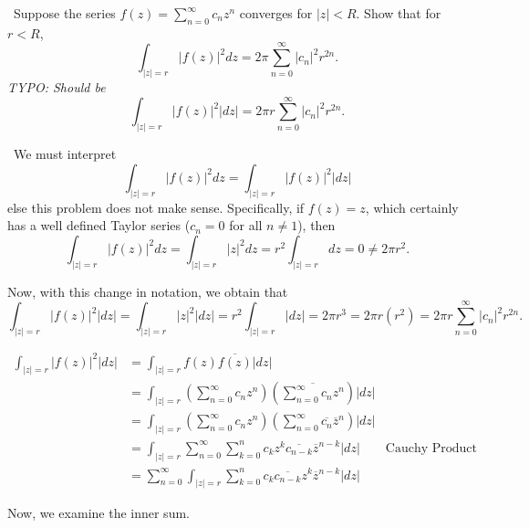 \documentclass[12pt]{Qual}
\begin{document}
\begin{problem} $\,$
Suppose the series $f(z)=\sum_{n=0}^\infty c_nz^n$ converges for $|z|<R$. Show that for $r<R$, $$\int_{|z|=r}|f(z)|^2dz=2\pi\sum_{n=0}^\infty|c_n|^2r^{2n}.$$ \textit{TYPO: Should be} $$\int_{|z|=r}|f(z)|^2|dz|=2\pi r\sum_{n=0}^\infty|c_n|^2r^{2n}.$$
\end{problem}


\begin{solution}$\,$
We must interpret $$\int_{|z|=r}|f(z)|^2dz=\int_{|z|=r}|f(z)|^2|dz|$$ else this problem does not make sense. Specifically, if $f(z)=z$, which certainly has a well defined Taylor series ($c_n=0$ for all $n\not=1$), then $$\int_{|z|=r}|f(z)|^2dz=\int_{|z|=r}|z|^2dz=r^2\int_{|z|=r}dz=0\not=2\pi r^2.$$

Now, with this change in notation, we obtain that $$\int_{|z|=r}|f(z)|^2|dz|=\int_{|z|=r}|z|^2|dz|=r^2\int_{|z|=r}|dz|=2\pi r^3=2\pi r( r^2)=2\pi r\sum_{n=0}^\infty|c_n|^2r^{2n}.$$

\begin{align*}
    \int_{|z|=r}|f(z)|^2|dz|&=\int_{|z|=r}f(z)\overline{f(z)}|dz|\\
    &=\int_{|z|=r}\left(\sum_{n=0}^\infty c_nz^n\right)\left(\overline{\sum_{n=0}^\infty c_nz^n}\right)|dz|\\
    &=\int_{|z|=r}\left(\sum_{n=0}^\infty c_nz^n\right)\left(\sum_{n=0}^\infty \overline{c_n}\overline{z}^n\right)|dz|\\
    &=\int_{|z|=r}\sum_{n=0}^\infty\sum_{k=0}^nc_kz^k\overline{c_{n-k}}\overline{z}^{n-k}|dz|\qquad\text{Cauchy Product}\\
    &=\sum_{n=0}^\infty\int_{|z|=r}\sum_{k=0}^nc_k\overline{c_{n-k}}z^k\overline{z}^{n-k}|dz|
    \end{align*}

Now, we examine the inner sum.

\begin{comment}
At this point, it is exceptionally helpful to illustrate this problem with two examples.

\boxed{n=3} Then, forgetting the $c_k,\overline{c_{n-k}}$ for a moment, we can look at $$\sum_{k=0}^3z^k\overline{z}^{3-k}=\overline{z}^3+z\overline{z}^2+z^2\overline{z}+z^3=\frac{z^3\overline{z}^3}{z^3}+\frac{z^2\overline{z}^2}{z}+z\cdot z\overline{z}+z^3=\frac{|z^3|^2}{z^3}+\frac{|z^2|^2}{z}+z|z|^2+z^3.$$

Note that if we integrate over the circle $|z|=r,$ then using the substitution $z=re^{i\theta}$ and $dz=rie^{i\theta}d\theta$ so $|dz|=rd\theta$, we will get that each of these functions dies. For example, $$\int_{|z|=r}\frac{|z|^6}{z^3}|dz|=r^7\int_0^{2\pi}\frac{1}{r^3e^{3i\theta}}d\theta=\int_0^{2\pi}\frac{i}{r^2e^{2i\theta}}d\theta=\frac{i}{-2ir^2}e^{-2i\theta}\big|_0^{2\pi}=0.$$ Since each integral will contain


\end{comment}
\end{solution}
\end{document}
